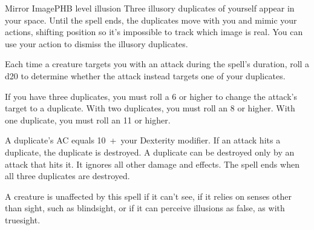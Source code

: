 \begin{spell}{Mirror Image}{PHB}{ level illusion}
{
}
Three illusory duplicates of yourself appear in your
space. Until the spell ends, the duplicates move with
you and mimic your actions, shifting position so it's
impossible to track which image is real. You can use
your action to dismiss the illusory duplicates.

Each time a creature targets you with an attack during
the spell's duration, roll a d20 to determine whether the
attack instead targets one of your duplicates.

If you have three duplicates, you must roll a 6 or
higher to change the attack's target to a duplicate. With
two duplicates, you must roll an 8 or higher. With one
duplicate, you must roll an 11 or higher.

A duplicate's AC equals 10~+~your Dexterity modifier.
If an attack hits a duplicate, the duplicate is destroyed. A
duplicate can be destroyed only by an attack that hits it.
It ignores all other damage and effects. The spell ends
when all three duplicates are destroyed.

A creature is unaffected by this spell if it can't see, if it
relies on senses other than sight, such as blindsight, or
if it can perceive illusions as false, as with truesight.
\end{spell}